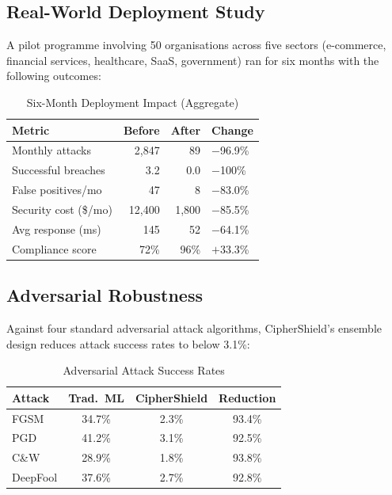 \documentclass[10pt, twocolumn]{article}
\begin{document}
\subsection{Real-World Deployment Study}

A pilot programme involving 50 organisations across five sectors 
(e-commerce, financial services, healthcare, SaaS, government) ran 
for six months with the following outcomes:

\begin{table}[H]
\centering
\caption{Six-Month Deployment Impact (Aggregate)}
\label{tab:deploy}
\small
\begin{tabular}{lrrl}
\toprule
\textbf{Metric} & \textbf{Before} & \textbf{After} & \textbf{Change} \\
\midrule
Monthly attacks      & 2,847 &    89 & $-$96.9\% \\
Successful breaches  &   3.2 &   0.0 & $-$100\%  \\
False positives/mo   &    47 &     8 & $-$83.0\% \\
Security cost (\$/mo)& 12,400 & 1,800 & $-$85.5\% \\
Avg response (ms)    &   145 &    52 & $-$64.1\% \\
Compliance score     &  72\% &  96\% & $+$33.3\% \\
\bottomrule
\end{tabular}
\end{table}

\subsection{Adversarial Robustness}

Against four standard adversarial attack algorithms, CipherShield's 
ensemble design reduces attack success rates to below 3.1\%:

\begin{table}[H]
\centering
\caption{Adversarial Attack Success Rates}
\label{tab:adv}
\small
\begin{tabular}{lccc}
\toprule
\textbf{Attack} & \textbf{Trad.\ ML} & \textbf{CipherShield} & \textbf{Reduction} \\
\midrule
FGSM     & 34.7\% & 2.3\% & 93.4\% \\
PGD      & 41.2\% & 3.1\% & 92.5\% \\
C\&W     & 28.9\% & 1.8\% & 93.8\% \\
DeepFool & 37.6\% & 2.7\% & 92.8\% \\
\bottomrule
\end{tabular}
\end{table}
\end{document}
